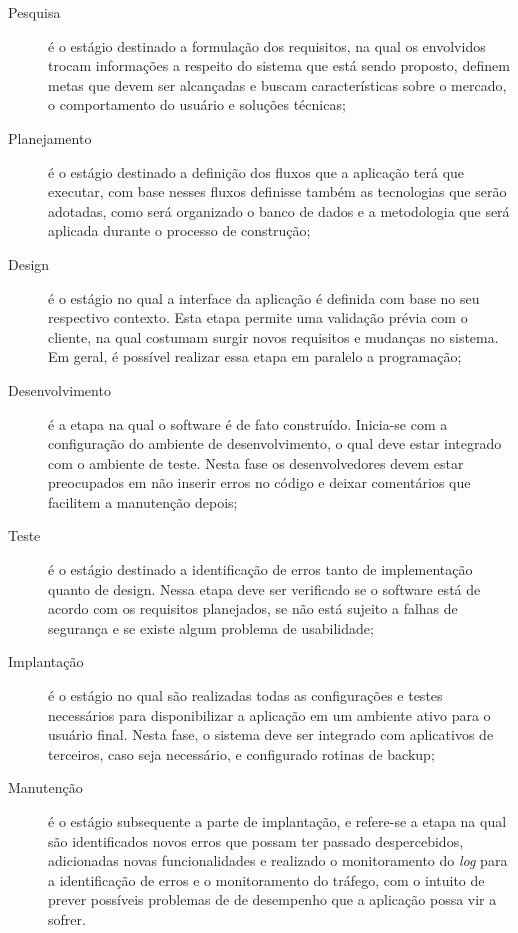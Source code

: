 \begin{description}
    \item[Pesquisa]{é o estágio destinado a formulação dos requisitos, na qual os
    envolvidos trocam informações a respeito do sistema que está sendo proposto,
    definem metas que devem ser alcançadas e buscam características sobre o mercado,
    o comportamento do usuário e soluções técnicas;}
    \item[Planejamento]{é o estágio destinado a definição dos fluxos que a aplicação
    terá que executar, com base nesses fluxos definisse também as tecnologias que
    serão adotadas, como será organizado o banco de dados e a metodologia que será
    aplicada durante o processo de construção;}
    \item[Design]{é o estágio no qual a interface da aplicação é definida com base
    no seu respectivo contexto. Esta etapa permite uma validação prévia com o cliente,
    na qual costumam surgir novos requisitos e mudanças no sistema. Em geral, é possível
    realizar essa etapa em paralelo a programação;}
    \item[Desenvolvimento]{é a etapa na qual o software é de fato construído. Inicia-se
    com a configuração do ambiente de desenvolvimento, o qual deve estar integrado com o
    ambiente de teste. Nesta fase os desenvolvedores devem estar preocupados em não
    inserir erros no código e deixar comentários que facilitem a manutenção depois;}
    \item[Teste]{é o estágio destinado a identificação de erros tanto de implementação
    quanto de design. Nessa etapa deve ser verificado se o software está de acordo com
    os requisitos planejados, se não está sujeito a falhas de segurança e se existe
    algum problema de usabilidade;}
    \item[Implantação]{é o estágio no qual são realizadas todas as configurações e testes
    necessários para disponibilizar a aplicação em um ambiente ativo para o usuário final.
    Nesta fase, o sistema deve ser integrado com aplicativos de terceiros, caso seja
    necessário, e configurado rotinas de backup;}
    \item[Manutenção]{é o estágio subsequente a parte de implantação, e refere-se a etapa
    na qual são identificados novos erros que possam ter passado despercebidos, adicionadas
    novas funcionalidades e realizado o monitoramento do \textit{log} para a identificação
    de erros e o monitoramento do tráfego, com o intuito de prever possíveis problemas de
    de desempenho que a aplicação possa vir a sofrer.}
\end{description}

